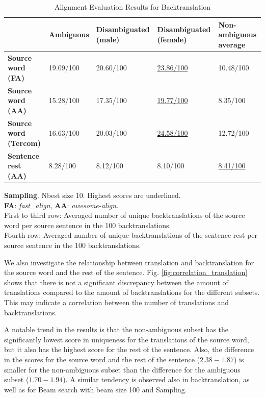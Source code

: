 \begin{table}[!htb]
    \ContinuedFloat 

    \begin{subtable}{\textwidth}
        \centering
        \begin{tabularx}{\linewidth}{|X|XXXX|}
            \hline
             & \textbf{Ambiguous} & \textbf{Disambiguated (male)} & \textbf{Disambiguated (female)} & \textbf{Non-ambiguous average} \\ \hline
             \textbf{Source word (FA)} & 19.09/100 & 20.60/100 & \underline{23.86/100} & 10.48/100 \\ 
             \textbf{Source word (AA)} & 15.28/100 & 17.35/100 & \underline{19.77/100} & 8.35/100 \\ 
             \textbf{Source word (Tercom)} & 16.63/100 & 20.03/100 & \underline{24.58/100} & 12.72/100 \\ \hline
             \textbf{Sentence rest (AA)} & 8.28/100 & 8.12/100 & 8.10/100 & \underline{8.41/100} \\ \hline
        \end{tabularx}
        \caption{\textbf{Sampling}. Nbest size 10. Highest scores are underlined. \\ \textbf{FA}: \textit{fast\_align}, \textbf{AA}: \textit{awesome-align}. \\ First to third row: Averaged number of unique backtranslations of the source word per source sentence in the 100 backtranslations. \\ Fourth row: Averaged number of unique backtranslations of the sentence rest per source sentence in the 100 backtranslations.}
        \label{tab:alignment_backtranslation_sampling}
    \end{subtable}

    \caption{Alignment Evaluation Results for Backtranslation}
    \label{tab:alignment_backtranslation}
\end{table}



We also investigate the relationship between translation and backtranslation for the source word and the rest of the sentence. Fig. \ref{fig:correlation_translation} shows that there is not a significant discrepancy between the amount of translations compared to the amount of backtranslations for the different subsets. This may indicate a correlation between the number of translations and backtranslations.

A notable trend in the results is that the non-ambiguous subset has the significantly lowest score in uniqueness for the translations of the source word, but it also has the highest score for the rest of the sentence. Also, the difference in the scores for the source word and the rest of the sentence ($2.38 - 1.87$) is smaller for the non-ambiguous subset than the difference for the ambiguous subset ($1.70 - 1.94$). A similar tendency is observed also in backtranslation, as well as for Beam search with beam size 100 and Sampling. 


